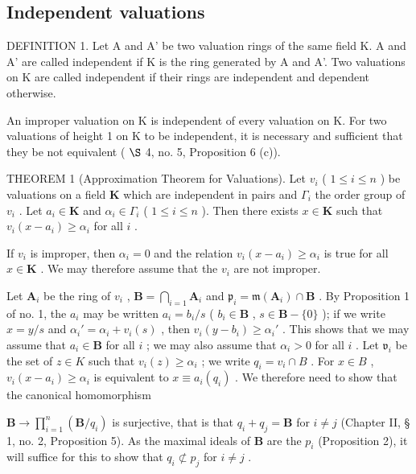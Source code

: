 \subsection{Independent valuations}

DEFINITION 1. Let A and A' be two valuation rings of the same field K. A and A' are called independent if K is the ring generated by A and A'. Two valuations on K are called independent if their rings are independent and dependent otherwise.

An improper valuation on K is independent of every valuation on K. For two valuations of height 1 on K to be independent, it is necessary and sufficient that they be not equivalent ( \(\S\) 4, no. 5, Proposition 6 (c)).

THEOREM 1 (Approximation Theorem for Valuations). Let \(v_{i}\) ( \(1 \leqslant i \leqslant n\) ) be valuations on a field \(\mathbf{K}\) which are independent in pairs and \(\Gamma_{i}\) the order group of \(v_{i}\) . Let \(a_{i} \in \mathbf{K}\) and \(\alpha_{i} \in \Gamma_{i}\) ( \(1 \leqslant i \leqslant n\) ). Then there exists \(x \in \mathbf{K}\) such that \(v_{i}(x - a_{i}) \geqslant \alpha_{i}\) for all \(i\) .

If \(v_{i}\) is improper, then \(\alpha_{i} = 0\) and the relation \(v_{i}(x - a_{i}) \geqslant \alpha_{i}\) is true for all \(x \in \mathbf{K}\) . We may therefore assume that the \(v_{i}\) are not improper.

Let \(\mathbf{A}_i\) be the ring of \(v_i\) , \(\mathbf{B} = \bigcap_{i=1} \mathbf{A}_i\) and \(\mathfrak{p}_i = \mathfrak{m}(\mathbf{A}_i) \cap \mathbf{B}\) . By Proposition 1 of no. 1, the \(a_i\) may be written \(a_i = b_i / s\) ( \(b_i \in \mathbf{B}\) , \(s \in \mathbf{B} - \{0\}\) ); if we write \(x = y / s\) and \(\alpha_i' = \alpha_i + v_i(s)\) , then \(v_i(y - b_i) \geqslant \alpha_i'\) . This shows that we may assume that \(a_i \in \mathbf{B}\) for all \(i\) ; we may also assume that \(\alpha_i > 0\) for all \(i\) . Let \(\mathfrak{v}_i\) be the set of \(z \in K\) such that \(v_{i}(z) \geqslant \alpha_{i}\) ; we write \(q_{i} = v_{i} \cap B\) . For \(x \in B\) , \(v_{i}(x - a_{i}) \geqslant \alpha_{i}\) is equivalent to \(x \equiv a_{i}(q_{i})\) . We therefore need to show that the canonical homomorphism

\(\mathbf{B} \to \prod_{i=1}^{n} \left( \mathbf{B} / q_i \right)\) is surjective, that is that \(q_i + q_j = \mathbf{B}\) for \(i \neq j\) (Chapter II, § 1, no. 2, Proposition 5). As the maximal ideals of \(\mathbf{B}\) are the \(p_i\) (Proposition 2), it will suffice for this to show that \(q_i \not\subset p_j\) for \(i \neq j\) .

